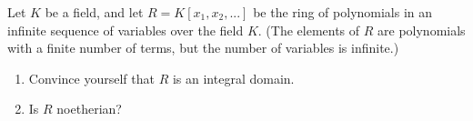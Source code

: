 \documentclass[12pt,letterpaper,boxed]{hmcpset}
\begin{document}
\begin{solution}
\end{solution}

\clearpage

\begin{problem}[18.2.5]
Let $K$ be a field, and let $R = K[x_1,x_2,...]$ be the ring of polynomials in an infinite sequence of variables over the field $K$. (The elements of $R$ are polynomials with a finite number of terms, but the number of variables is infinite.)
\begin{enumerate}[label=\alph*]
\item Convince yourself that $R$ is an integral domain.
\item Is $R$ noetherian?
\end{enumerate}
\end{problem}

\begin{solution}
\end{solution}
\end{document}
